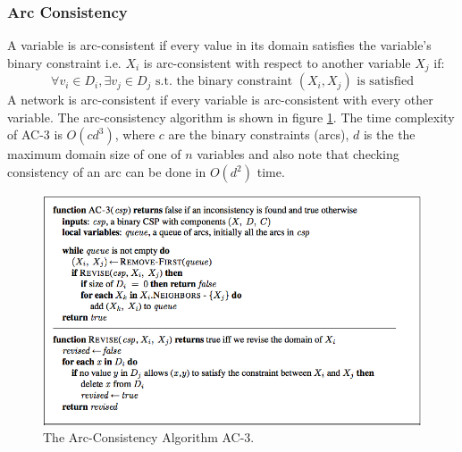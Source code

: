 \documentclass[twoside]{article}
\begin{document}
\subsubsection{Arc Consistency}
A variable is arc-consistent if every value in its domain satisfies the 
variable's binary constraint i.e. \(X_i\) is arc-consistent with respect to 
another variable \(X_j\) if:
\begin{equation}
        \forall v_i \in D_i, \exists v_j \in D_j \text{ s.t. } \text{the binary constraint } (X_i, X_j) \text{ is satisfied}
\end{equation}
A network is arc-consistent if every variable is arc-consistent with every
other variable. The arc-consistency algorithm is shown in figure \ref{fig:ac3}.
The time complexity of AC-3 is \(O(cd^3)\), where \(c\) are the binary 
constraints (arcs), \(d\) is the the maximum domain size of one of \(n\) 
variables and also note that checking consistency of an arc can be done in 
\(O(d^2)\) time.
\begin{figure}
  \includegraphics[width=\linewidth]{ac3.png}
  \caption{The Arc-Consistency Algorithm AC-3.}
  \label{fig:ac3}
\end{figure}
\end{document}
